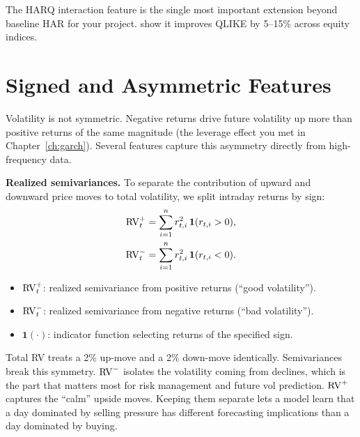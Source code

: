 \begin{projectconnection}
The HARQ interaction feature is the single most important extension beyond baseline HAR for your project. \citet{BollerslevPattonQuaedvlieg2016HARQ} show it improves QLIKE by 5--15\% across equity indices.
\end{projectconnection}

\section{Signed and Asymmetric Features}\label{sec:feat-signed}

Volatility is not symmetric.
Negative returns drive future volatility up more than positive returns of the same magnitude (the leverage effect you met in Chapter~\ref{ch:garch}).
Several features capture this asymmetry directly from high-frequency data.

\textbf{Realized semivariances.}
To separate the contribution of upward and downward price moves to total volatility, we split intraday returns by sign:
\begin{align}
\operatorname{RV}_t^+ &= \sum_{i=1}^{n} r_{t,i}^2 \,\mathbf{1}(r_{t,i} > 0), \label{eq:rs-plus}\\
\operatorname{RV}_t^- &= \sum_{i=1}^{n} r_{t,i}^2 \,\mathbf{1}(r_{t,i} < 0). \label{eq:rs-minus}
\end{align}
\begin{itemize}[nosep]
  \item $\operatorname{RV}_t^+$: realized semivariance from positive returns (``good volatility'').
  \item $\operatorname{RV}_t^-$: realized semivariance from negative returns (``bad volatility'').
  \item $\mathbf{1}(\cdot)$: indicator function selecting returns of the specified sign.
\end{itemize}

\begin{intuition}
Total RV treats a 2\% up-move and a 2\% down-move identically. Semivariances break this symmetry. $\operatorname{RV}^-$ isolates the volatility coming from declines, which is the part that matters most for risk management and future vol prediction. $\operatorname{RV}^+$ captures the ``calm'' upside moves. Keeping them separate lets a model learn that a day dominated by selling pressure has different forecasting implications than a day dominated by buying.
\end{intuition}

